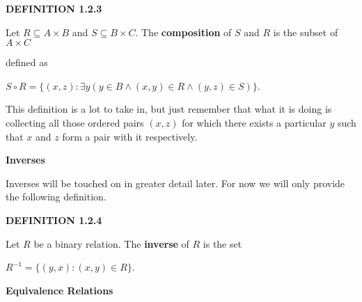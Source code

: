 \documentclass[12pt, a4paper]{article}
\begin{document}
\noindent\blacksquare\textbf{ DEFINITION 1.2.3}\par

\vspace{4mm}

Let $R\subseteq A\times B$ and $S\subseteq B\times C$. The \textbf{composition} of $S$ and $R$ is the subset of $A\times C$\par defined as\par

\vspace{4mm}

\centerline{$S\circ R=\{(x,z)\colon\exists y(y\in B\wedge(x,y)\in R\wedge(y,z)\in S)\}$.}

\vspace{4mm}

\noindent This definition is a lot to take in, but just remember that what it is doing is collecting all those ordered pairs $(x,z)$ for which there exists a particular $y$ such that $x$ and $z$ form a pair with it respectively.\par

\vspace{6mm}

\noindent\large\textbf{Inverses}\normalsize\par

\vspace{4mm}

\noindent Inverses will be touched on in greater detail later. For now we will only provide the following definition.\par

\vspace{4mm}

\noindent\blacksquare\textbf{ DEFINITION 1.2.4}\par

\vspace{4mm}

Let $R$ be a binary relation. The \textbf{inverse} of $R$ is the set\par

\vspace{4mm}

\centerline{$R^{-1}=\{(y,x)\colon(x,y)\in R\}$.}

\vspace{6mm}

\noindent\large\textbf{Equivalence Relations}\normalsize\par

\vspace{4mm}
\end{document}

